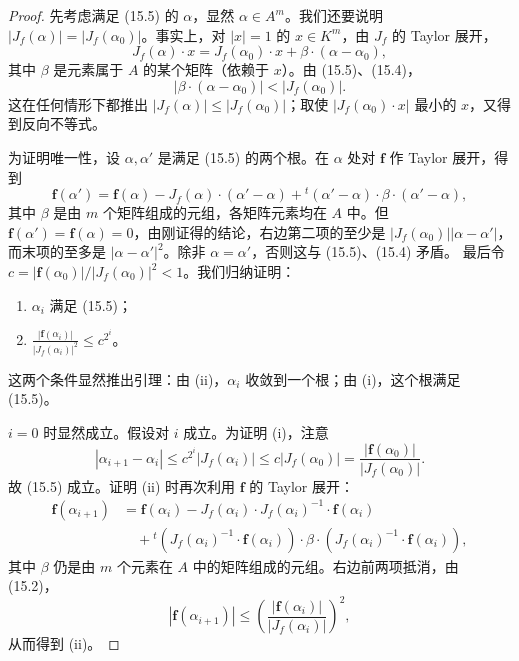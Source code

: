 \begin{proof}
先考虑满足 (15.5) 的 $\alpha$，显然 $\alpha\in A^m$。我们还要说明 $|J_f(\alpha)|=|J_f(\alpha_0)|$。事实上，对 $|x|=1$ 的 $x\in K^m$，由 $J_f$ 的 Taylor 展开，
\[
J_f(\alpha)\cdot x=J_f(\alpha_0)\cdot x+\beta\cdot(\alpha-\alpha_0),
\]
其中 $\beta$ 是元素属于 $A$ 的某个矩阵（依赖于 $x$）。由 (15.5)、(15.4)，
\[
|\beta\cdot(\alpha-\alpha_0)|<|J_f(\alpha_0)|.
\]
这在任何情形下都推出 $|J_f(\alpha)|\le|J_f(\alpha_0)|$；取使 $|J_f(\alpha_0)\cdot x|$ 最小的 $x$，又得到反向不等式。

为证明唯一性，设 $\alpha,\alpha'$ 是满足 (15.5) 的两个根。在 $\alpha$ 处对 $\mathbf f$ 作 Taylor 展开，得到
\[
\mathbf f(\alpha')=\mathbf f(\alpha)-J_f(\alpha)\cdot(\alpha'-\alpha)
+{}^t(\alpha'-\alpha)\cdot\beta\cdot(\alpha'-\alpha),
\]
其中 $\beta$ 是由 $m$ 个矩阵组成的元组，各矩阵元素均在 $A$ 中。但 $\mathbf f(\alpha')=\mathbf f(\alpha)=0$，由刚证得的结论，右边第二项的至少是 $|J_f(\alpha_0)||\alpha-\alpha'|$，而末项的至多是 $|\alpha-\alpha'|^2$。除非 $\alpha=\alpha'$，否则这与 (15.5)、(15.4) 矛盾。
最后令 $c=|\mathbf f(\alpha_0)|/|J_f(\alpha_0)|^2<1$。我们归纳证明：
\begin{enumerate}[label=(\roman*).]
\item $\alpha_i$ 满足 (15.5)；
\item $\displaystyle\frac{|\mathbf f(\alpha_i)|}{|J_f(\alpha_i)|^2}\le c^{2^i}$。
\end{enumerate}
这两个条件显然推出引理：由 (ii)，$\alpha_i$ 收敛到一个根；由 (i)，这个根满足 (15.5)。

$i=0$ 时显然成立。假设对 $i$ 成立。为证明 (i)，注意
\[
|\alpha_{i+1}-\alpha_i|\le c^{2^i}|J_f(\alpha_i)|
\le c|J_f(\alpha_0)|=\frac{|\mathbf f(\alpha_0)|}{|J_f(\alpha_0)|}.
\]
故 (15.5) 成立。证明 (ii) 时再次利用 $\mathbf f$ 的 Taylor 展开：
\begin{align*}
\mathbf f(\alpha_{i+1})
&=\mathbf f(\alpha_i)-J_f(\alpha_i)\cdot J_f(\alpha_i)^{-1}\cdot\mathbf f(\alpha_i)\\
&\quad+{}^t(J_f(\alpha_i)^{-1}\cdot\mathbf f(\alpha_i))\cdot\beta\cdot
(J_f(\alpha_i)^{-1}\cdot\mathbf f(\alpha_i)),
\end{align*}
其中 $\beta$ 仍是由 $m$ 个元素在 $A$ 中的矩阵组成的元组。右边前两项抵消，由 (15.2)，
\begin{equation*}\tag{15.7}
|\mathbf f(\alpha_{i+1})|\le\left(\frac{|\mathbf f(\alpha_i)|}{|J_f(\alpha_i)|}\right)^2,
\end{equation*}
从而得到 (ii)。
\end{proof}
